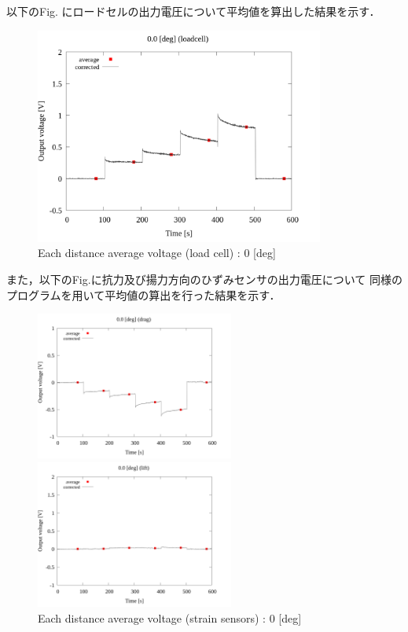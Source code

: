 以下のFig. にロードセルの出力電圧について平均値を算出した結果を示す．

\begin{figure}[htbp]
	\footnotesize
	\begin{center}
		\includegraphics[width=95mm]{../../02_workspace/result/2-1/plot/03-1_loadcell/03_loadcell_average_0.png}
		\caption{Each distance average voltage (load cell) : 0 [deg]}
	\end{center}
\end{figure}

また，以下のFig.に抗力及び揚力方向のひずみセンサの出力電圧について
同様のプログラムを用いて平均値の算出を行った結果を示す．

\begin{figure}[htbp]
	\begin{minipage}[b]{0.45\linewidth}
		\centering
		\includegraphics[width=65mm]{../../02_workspace/result/2-1/plot/03-2_drag/03_drag_average_0.png}
	\end{minipage}
	\begin{minipage}[b]{0.45\linewidth}
		\centering
		\includegraphics[width=65mm]{../../02_workspace/result/2-1/plot/03-3_lift/03_lift_average_0.png}
	\end{minipage}
  \caption{Each distance average voltage (strain sensors) : 0 [deg]}
\end{figure}

